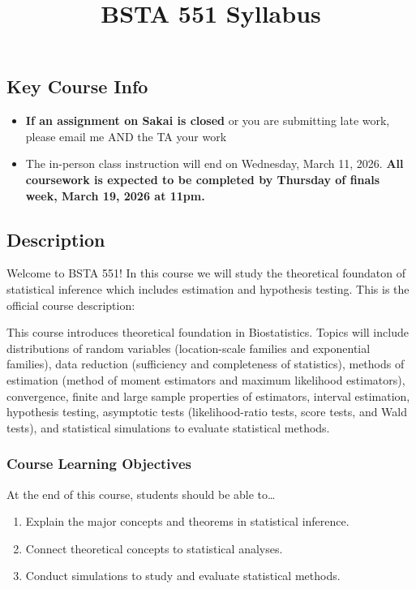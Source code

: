 \documentclass[
  letterpaper,
  DIV=11,
  numbers=noendperiod]{scrartcl}
\title{BSTA 551 Syllabus}
\author{}
\date{}
\providecommand{\tightlist}{%
  \setlength{\itemsep}{0pt}\setlength{\parskip}{0pt}}\usepackage{longtable,booktabs,array}
\begin{document}
\maketitle


\subsection{Key Course Info}\label{key-course-info}

\begin{itemize}
\tightlist
\item
  \textbf{If an assignment on Sakai is closed} or you are submitting
  late work, please email me AND the TA your work
\item
  The in-person class instruction will end on Wednesday, March 11, 2026.
  \textbf{All coursework is expected to be completed by Thursday of
  finals week, March 19, 2026 at 11pm.}
\end{itemize}

\subsection{Description}\label{description}

Welcome to BSTA 551! In this course we will study the theoretical
foundaton of statistical inference which includes estimation and
hypothesis testing. This is the official course description:

This course introduces theoretical foundation in Biostatistics. Topics
will include distributions of random variables (location-scale families
and exponential families), data reduction (sufficiency and completeness
of statistics), methods of estimation (method of moment estimators and
maximum likelihood estimators), convergence, finite and large sample
properties of estimators, interval estimation, hypothesis testing,
asymptotic tests (likelihood-ratio tests, score tests, and Wald tests),
and statistical simulations to evaluate statistical methods.

\subsubsection{Course Learning
Objectives}\label{course-learning-objectives}

At the end of this course, students should be able to\ldots{}

\begin{enumerate}
\def\labelenumi{\arabic{enumi}.}
\tightlist
\item
  Explain the major concepts and theorems in statistical inference.
\item
  Connect theoretical concepts to statistical analyses.
\item
  Conduct simulations to study and evaluate statistical methods.
\end{enumerate}
\end{document}
